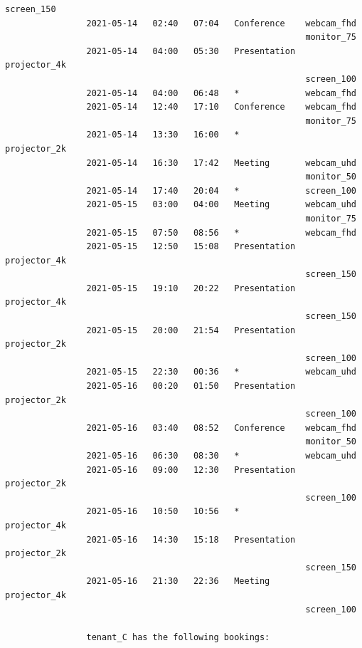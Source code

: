 \documentclass{article}
\begin{document}
\begin{Verbatim}[gobble=8]
                                                           screen_150
                2021-05-14   02:40   07:04   Conference    webcam_fhd
                                                           monitor_75
                2021-05-14   04:00   05:30   Presentation  projector_4k
                                                           screen_100
                2021-05-14   04:00   06:48   *             webcam_fhd
                2021-05-14   12:40   17:10   Conference    webcam_fhd
                                                           monitor_75
                2021-05-14   13:30   16:00   *             projector_2k
                2021-05-14   16:30   17:42   Meeting       webcam_uhd
                                                           monitor_50
                2021-05-14   17:40   20:04   *             screen_100
                2021-05-15   03:00   04:00   Meeting       webcam_uhd
                                                           monitor_75
                2021-05-15   07:50   08:56   *             webcam_fhd
                2021-05-15   12:50   15:08   Presentation  projector_4k
                                                           screen_150
                2021-05-15   19:10   20:22   Presentation  projector_4k
                                                           screen_150
                2021-05-15   20:00   21:54   Presentation  projector_2k
                                                           screen_100
                2021-05-15   22:30   00:36   *             webcam_uhd
                2021-05-16   00:20   01:50   Presentation  projector_2k
                                                           screen_100
                2021-05-16   03:40   08:52   Conference    webcam_fhd
                                                           monitor_50
                2021-05-16   06:30   08:30   *             webcam_uhd
                2021-05-16   09:00   12:30   Presentation  projector_2k
                                                           screen_100
                2021-05-16   10:50   10:56   *             projector_4k
                2021-05-16   14:30   15:18   Presentation  projector_2k
                                                           screen_150
                2021-05-16   21:30   22:36   Meeting       projector_4k
                                                           screen_100
                
                tenant_C has the following bookings:
                

\end{Verbatim}
\end{document}
